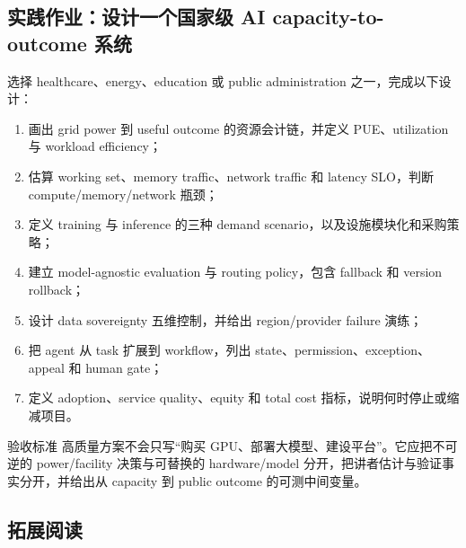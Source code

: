 \documentclass[a4paper]{article}
\begin{document}
\subsection{实践作业：设计一个国家级 AI capacity-to-outcome 系统}

选择 healthcare、energy、education 或 public administration 之一，完成以下设计：

\begin{enumerate}
  \item 画出 grid power 到 useful outcome 的资源会计链，并定义 PUE、utilization 与 workload efficiency；
  \item 估算 working set、memory traffic、network traffic 和 latency SLO，判断 compute/memory/network 瓶颈；
  \item 定义 training 与 inference 的三种 demand scenario，以及设施模块化和采购策略；
  \item 建立 model-agnostic evaluation 与 routing policy，包含 fallback 和 version rollback；
  \item 设计 data sovereignty 五维控制，并给出 region/provider failure 演练；
  \item 把 agent 从 task 扩展到 workflow，列出 state、permission、exception、appeal 和 human gate；
  \item 定义 adoption、service quality、equity 和 total cost 指标，说明何时停止或缩减项目。
\end{enumerate}

\begin{knowledgebox}{验收标准}
高质量方案不会只写“购买 GPU、部署大模型、建设平台”。它应把不可逆的 power/facility 决策与可替换的 hardware/model 分开，把讲者估计与验证事实分开，并给出从 capacity 到 public outcome 的可测中间变量。
\end{knowledgebox}

\subsection{拓展阅读}
\end{document}
